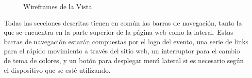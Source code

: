 \begin{figure}
{\begin{subfigure}
        \label{fig:wireframe_capt_img}
    \end{subfigure}
    }
    \hfill
\caption{Wireframes de la Vista}
\label{fig:wireframes_vista}
\end{figure}




Todas las secciones descritas tienen en común las barras de navegación, tanto la que se encuentra en la parte superior de la página web como la lateral. Estas barras de navegación estarán compuestas por el logo del evento, una serie de \glspl{link} para el rápido movimiento a través del sitio web, un interruptor para el cambio de tema de colores, y un botón para desplegar menú lateral si es necesario según el dispositivo que se esté utilizando.

